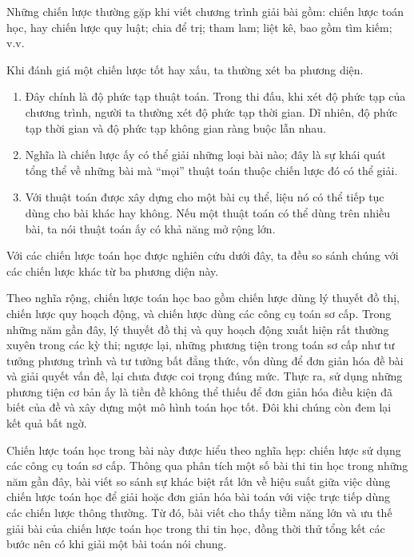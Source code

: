 \documentclass[11pt]{article}
\begin{document}
Những chiến lược thường gặp khi viết chương trình giải bài gồm: chiến lược
toán học, hay chiến lược quy luật; chia để trị; tham lam; liệt kê, bao gồm
tìm kiếm; v.v.

Khi đánh giá một chiến lược tốt hay xấu, ta thường xét ba phương diện.

\begin{enumerate}
  \item {} Đây chính là độ phức tạp thuật toán. Trong thi đấu,
  khi xét độ phức tạp của chương trình, người ta thường xét độ phức tạp thời
  gian. Dĩ nhiên, độ phức tạp thời gian và độ phức tạp không gian ràng buộc
  lẫn nhau.

  \item {} Nghĩa là chiến lược ấy có thể giải những loại
  bài nào; đây là sự khái quát tổng thể về những bài mà ``mọi'' thuật toán
  thuộc chiến lược đó có thể giải.

  \item {} Với thuật toán được xây dựng cho một bài cụ
  thể, liệu nó có thể tiếp tục dùng cho bài khác hay không. Nếu một thuật
  toán có thể dùng trên nhiều bài, ta nói thuật toán ấy có khả năng mở rộng
  lớn.
\end{enumerate}

Với các chiến lược toán học được nghiên cứu dưới đây, ta đều so sánh chúng
với các chiến lược khác từ ba phương diện này.

Theo nghĩa rộng, chiến lược toán học bao gồm chiến lược dùng lý thuyết đồ thị,
chiến lược quy hoạch động, và chiến lược dùng các công cụ toán sơ cấp. Trong
những năm gần đây, lý thuyết đồ thị và quy hoạch động xuất hiện rất thường
xuyên trong các kỳ thi; ngược lại, những phương tiện trong toán sơ cấp như tư
tưởng phương trình và tư tưởng bất đẳng thức, vốn dùng để đơn giản hóa đề bài
và giải quyết vấn đề, lại chưa được coi trọng đúng mức. Thực ra, sử dụng
những phương tiện cơ bản ấy là tiền đề không thể thiếu để đơn giản hóa điều
kiện đã biết của đề và xây dựng một mô hình toán học tốt. Đôi khi chúng còn
đem lại kết quả bất ngờ.

Chiến lược toán học trong bài này được hiểu theo nghĩa hẹp: chiến lược sử
dụng các công cụ toán sơ cấp. Thông qua phân tích một số bài thi tin học
trong những năm gần đây, bài viết so sánh sự khác biệt rất lớn về hiệu suất
giữa việc dùng chiến lược toán học để giải hoặc đơn giản hóa bài toán với
việc trực tiếp dùng các chiến lược thông thường. Từ đó, bài viết cho thấy
tiềm năng lớn và ưu thế giải bài của chiến lược toán học trong thi tin học,
đồng thời thử tổng kết các bước nên có khi giải một bài toán nói chung.
\end{document}
